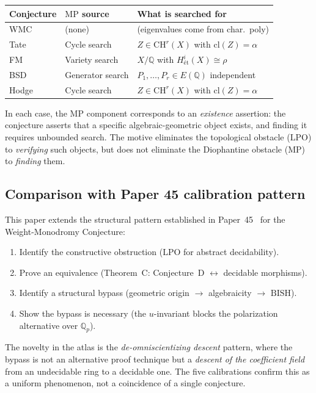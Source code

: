 \documentclass[11pt]{article}
\theoremstyle{definition}
\theoremstyle{remark}
\newcommand{\Q}{\mathbb{Q}}
\newcommand{\Qp}{\Q_p}
\newcommand{\LPO}{\mathrm{LPO}}
\newcommand{\MP}{\mathrm{MP}}
\newcommand{\BISH}{\mathrm{BISH}}
\begin{document}
\begin{center}
\small
\begin{tabular}{lll}
\toprule
\textbf{Conjecture} & \textbf{$\MP$ source} & \textbf{What is searched for} \\
\midrule
WMC & (none) & (eigenvalues come from char.\ poly) \\
Tate & Cycle search & $Z \in \mathrm{CH}^r(X)$ with $\mathrm{cl}(Z) = \alpha$ \\
FM & Variety search & $X/\Q$ with $H^i_{\text{\'et}}(X) \cong \rho$ \\
BSD & Generator search & $P_1, \ldots, P_r \in E(\Q)$ independent \\
Hodge & Cycle search & $Z \in \mathrm{CH}^r(X)$ with $\mathrm{cl}(Z) = \alpha$ \\
\bottomrule
\end{tabular}
\end{center}

\noindent In each case, the $\MP$ component corresponds to an \emph{existence} assertion: the conjecture asserts that a specific algebraic-geometric object exists, and finding it requires unbounded search. The motive eliminates the topological obstacle ($\LPO$) to \emph{verifying} such objects, but does not eliminate the Diophantine obstacle ($\MP$) to \emph{finding} them.

\subsection{Comparison with Paper 45 calibration pattern}

This paper extends the structural pattern established in Paper~45~\cite{Paper45} for the Weight-Monodromy Conjecture:
\begin{enumerate}
\item Identify the constructive obstruction ($\LPO$ for abstract decidability).
\item Prove an equivalence (Theorem~C: Conjecture~D $\leftrightarrow$ decidable morphisms).
\item Identify a structural bypass (geometric origin $\to$ algebraicity $\to$ $\BISH$).
\item Show the bypass is necessary (the $u$-invariant blocks the polarization alternative over $\Qp$).
\end{enumerate}
The novelty in the atlas is the \emph{de-omniscientizing descent} pattern, where the bypass is not an alternative proof technique but a \emph{descent of the coefficient field} from an undecidable ring to a decidable one. The five calibrations confirm this as a uniform phenomenon, not a coincidence of a single conjecture.
\end{document}
